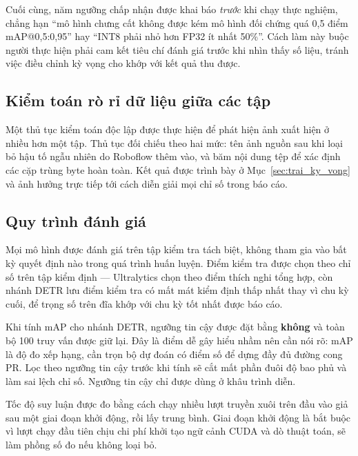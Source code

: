 Cuối cùng, năm ngưỡng chấp nhận được khai báo \emph{trước} khi chạy thực nghiệm, chẳng hạn ``mô hình
chưng cất không được kém mô hình đối chứng quá 0,5 điểm mAP@0,5:0,95'' hay ``INT8 phải nhỏ hơn FP32
ít nhất 50\%''. Cách làm này buộc người thực hiện phải cam kết tiêu chí đánh giá trước khi nhìn thấy
số liệu, tránh việc điều chỉnh kỳ vọng cho khớp với kết quả thu được.

\subsection{Kiểm toán rò rỉ dữ liệu giữa các tập}

Một thủ tục kiểm toán độc lập được thực hiện để phát hiện ảnh xuất hiện ở nhiều hơn một tập. Thủ
tục đối chiếu theo hai mức: tên ảnh nguồn sau khi loại bỏ hậu tố ngẫu nhiên do Roboflow thêm vào,
và băm nội dung tệp để xác định các cặp trùng byte hoàn toàn. Kết quả được trình bày ở
Mục~\ref{sec:trai_ky_vong} và ảnh hưởng trực tiếp tới cách diễn giải mọi chỉ số trong báo cáo.

\subsection{Quy trình đánh giá}

Mọi mô hình được đánh giá trên tập kiểm tra tách biệt, không tham gia vào bất kỳ quyết định nào
trong quá trình huấn luyện. Điểm kiểm tra được chọn theo chỉ số trên tập kiểm định --- Ultralytics
chọn theo điểm thích nghi tổng hợp, còn nhánh DETR lưu điểm kiểm tra có mất mát kiểm định thấp
nhất thay vì chu kỳ cuối, để trọng số trên đĩa khớp với chu kỳ tốt nhất được báo cáo.

Khi tính mAP cho nhánh DETR, ngưỡng tin cậy được đặt bằng \textbf{không} và toàn bộ 100 truy vấn
được giữ lại. Đây là điểm dễ gây hiểu nhầm nên cần nói rõ: mAP là độ đo xếp hạng, cần trọn bộ dự
đoán có điểm số để dựng đầy đủ đường cong PR. Lọc theo ngưỡng tin cậy trước khi tính sẽ cắt mất
phần đuôi độ bao phủ và làm sai lệch chỉ số. Ngưỡng tin cậy chỉ được dùng ở khâu trình diễn.

Tốc độ suy luận được đo bằng cách chạy nhiều lượt truyền xuôi trên đầu vào giả sau một giai đoạn
khởi động, rồi lấy trung bình. Giai đoạn khởi động là bắt buộc vì lượt chạy đầu tiên chịu chi phí
khởi tạo ngữ cảnh CUDA và dò thuật toán, sẽ làm phồng số đo nếu không loại bỏ.
